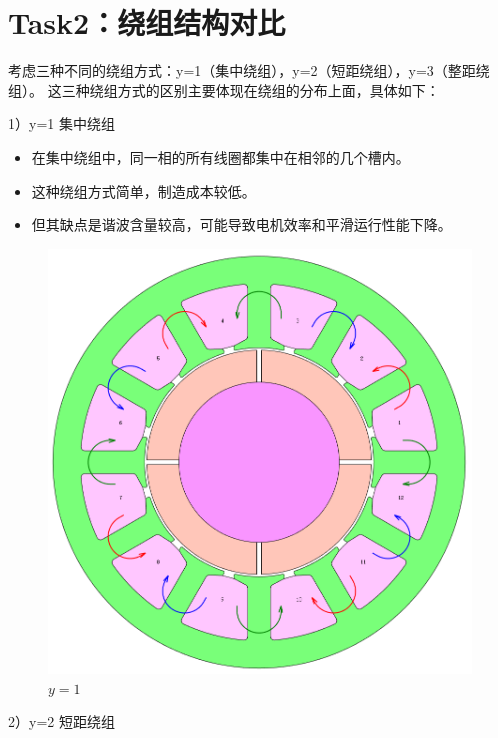 \documentclass{thuemp}
\begin{document}
\section{Task2：绕组结构对比}
考虑三种不同的绕组方式：y=1（集中绕组），y=2（短距绕组），y=3（整距绕组）。
这三种绕组方式的区别主要体现在绕组的分布上面，具体如下：

1）y=1 集中绕组

\begin{itemize}
	\item 在集中绕组中，同一相的所有线圈都集中在相邻的几个槽内。
	\item 这种绕组方式简单，制造成本较低。
	\item 但其缺点是谐波含量较高，可能导致电机效率和平滑运行性能下降。
\end{itemize}
\begin{figure}[H]
  \centering
  \includegraphics[width=1\linewidth]{./img/task2/model1.png}
  \caption{$y=1$}
\end{figure}

2）y=2 短距绕组
\end{document}
